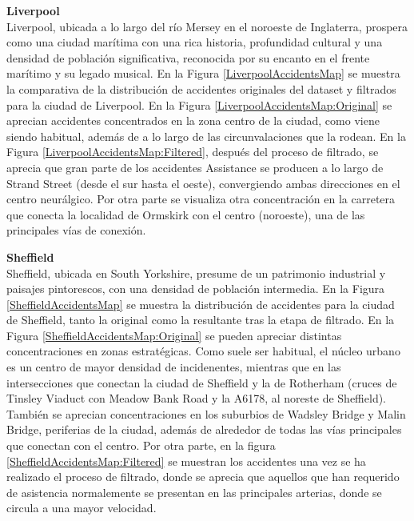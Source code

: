 \documentclass{uathesis-es}
\begin{document}
{\textbf{Liverpool}\\

Liverpool, ubicada a lo largo del río Mersey en el noroeste de Inglaterra, prospera como una ciudad marítima con una rica historia, profundidad cultural y una densidad de población significativa, reconocida por su encanto en el frente marítimo y su legado musical. En la Figura \ref{LiverpoolAccidentsMap} se muestra la comparativa de la distribución de accidentes originales del dataset y filtrados para la ciudad de Liverpool. En la Figura \ref{LiverpoolAccidentsMap:Original} se aprecian accidentes concentrados en la zona centro de la ciudad, como viene siendo habitual, además de a lo largo de las circunvalaciones que la rodean. En la Figura \ref{LiverpoolAccidentsMap:Filtered}, después del proceso de filtrado, se aprecia que gran parte de los accidentes Assistance se producen a lo largo de Strand Street (desde el sur hasta el oeste), convergiendo ambas direcciones en el centro neurálgico. Por otra parte se visualiza otra concentración en la carretera que conecta la localidad de Ormskirk con el centro (noroeste), una de las principales vías de conexión.




\textbf{Sheffield}\\

Sheffield, ubicada en South Yorkshire, presume de un patrimonio industrial y paisajes pintorescos, con una densidad de población intermedia. En la Figura \ref{SheffieldAccidentsMap} se muestra la distribución de accidentes para la ciudad de Sheffield, tanto la original como la resultante tras la etapa de filtrado. En la Figura \ref{SheffieldAccidentsMap:Original} se pueden apreciar distintas concentraciones en zonas estratégicas. Como suele ser habitual, el núcleo urbano es un centro de mayor densidad de incidenentes, mientras que en las intersecciones que conectan la ciudad de Sheffield y la de Rotherham (cruces de Tinsley Viaduct con Meadow Bank Road y la A6178, al noreste de Sheffield). También se aprecian concentraciones en los suburbios de Wadsley Bridge y Malin Bridge, periferias de la ciudad, además de alrededor de todas las vías principales que conectan con el centro. Por otra parte, en la figura \ref{SheffieldAccidentsMap:Filtered} se muestran los accidentes una vez se ha realizado el proceso de filtrado, donde se aprecia que aquellos que han requerido de asistencia normalemente se presentan en las principales arterias, donde se circula a una mayor velocidad.

}
\end{document}
